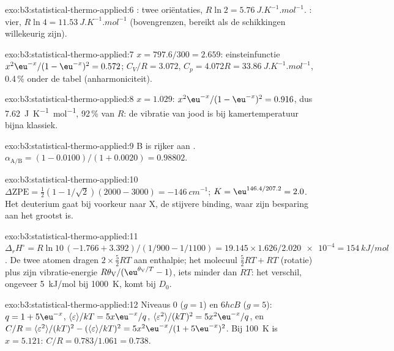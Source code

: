 \begin{solution}{exo:b3:statistical-thermo-applied:6}
: twee oriëntaties, $R\ln2 = \qty{5.76}{J.K^{-1}.mol^{-1}}$. : vier, $R\ln4 =
\qty{11.53}{J.K^{-1}.mol^{-1}}$ (bovengrenzen, bereikt als de schikkingen
willekeurig zijn).
\end{solution}

\begin{solution}{exo:b3:statistical-thermo-applied:7}
$x = 797.6/300 = 2.659$: einsteinfunctie $x^2\eu^{-x}/(1 - \eu^{-x})^2 = 0.572$; $C_V/R = 3.072$,
$C_p = 4.072R = \qty{33.86}{J.K^{-1}.mol^{-1}}$, 0.4\,\% onder de tabel
(anharmoniciteit).
\end{solution}

\begin{solution}{exo:b3:statistical-thermo-applied:8}
$x = 1.029$: $x^2\eu^{-x}/(1 - \eu^{-x})^2 = 0.916$, dus \qty{7.62}{J.K^{-1}.mol^{-1}},
92\,\% van $R$: de vibratie van jood is bij kamertemperatuur bijna
klassiek.
\end{solution}

\begin{solution}{exo:b3:statistical-thermo-applied:9}
B is rijker aan . $\alpha_{\mathrm{A/B}} = (1 - 0.0100)/(1 + 0.0020) = 0.98802$.
\end{solution}

\begin{solution}{exo:b3:statistical-thermo-applied:10}
$\Delta\mathrm{ZPE} = \frac12(1 - 1/\sqrt2)(2000 - 3000) = \qty{-146}{cm^{-1}}$; $K = \eu^{146.4/207.2} = 2.0$.
Het deuterium gaat bij voorkeur naar X, de stijvere binding, waar zijn
besparing aan  het grootst is.
\end{solution}

\begin{solution}{exo:b3:statistical-thermo-applied:11}
$\Delta_rH^\circ = R\ln10\,(-1.766 + 3.392)/(1/900 - 1/1100) = 19.145 \times 1.626/\num{2.020e-4} =
\qty{154}{kJ/mol}$. De twee atomen dragen $2 \times \frac52RT$ aan
enthalpie; het molecuul $\frac52RT + RT$
(rotatie) plus zijn vibratie-energie $R\theta_{\mathrm V}/(\eu^{\theta_{\mathrm V}/T} - 1)$, iets minder dan $RT$:
het verschil, ongeveer \qty{5}{kJ/mol} bij \qty{1000}{K}, komt bij $D_0$.
\end{solution}

\begin{solution}{exo:b3:statistical-thermo-applied:12}
Niveaus 0 ($g = 1$) en $6hcB$ ($g = 5$): $q = 1 + 5\eu^{-x}$, $\langle\varepsilon\rangle/kT = 5x\eu^{-x}/q$, $\langle\varepsilon^2\rangle/(kT)^2 =
5x^2\eu^{-x}/q$, en $C/R = \langle\varepsilon^2\rangle/(kT)^2 - (\langle\varepsilon\rangle/kT)^2 = 5x^2\eu^{-x}/(1 + 5\eu^{-x})^2$. Bij
\qty{100}{K} is $x = 5.121$: $C/R = 0.783/1.061 = 0.738$.
\end{solution}

